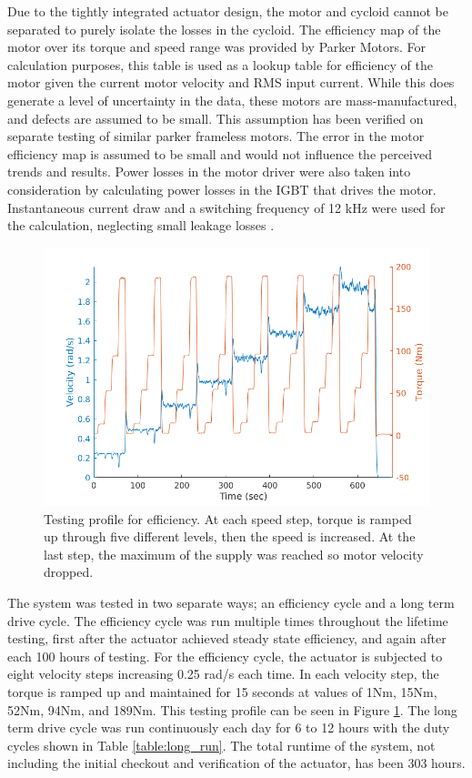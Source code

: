 Due to the tightly integrated actuator design, the motor and cycloid cannot be separated to purely isolate the losses in the cycloid.
The efficiency map of the motor over its torque and speed range was provided by Parker Motors.
For calculation purposes, this table is used as a lookup table for efficiency of the motor given the current motor velocity and RMS input current.
While this does generate a level of uncertainty in the data, these motors are mass-manufactured, and defects are assumed to be small. This assumption has been verified on separate testing of similar parker frameless motors. 
The error in the motor efficiency map is assumed to be small and would not influence the perceived trends and results.
Power losses in the motor driver were also taken into consideration by calculating power losses in the IGBT that drives the motor.
Instantaneous current draw and a switching frequency of 12 kHz were used for the calculation, neglecting small leakage losses \cite{ref:IGBTPower}.

\begin{figure}[t]
   \centering
   \includegraphics[width=\linewidth]{fig/eff_test_profile_v4}
   \caption{Testing profile for efficiency.
   At each speed step, torque is ramped up through five different levels, then the speed is increased.
   At the last step, the maximum of the supply was reached so motor velocity dropped.}
   \label{fig:eff_profile}
\end{figure}

The system was tested in two separate ways; an efficiency cycle and a long term drive cycle.
The efficiency cycle was run multiple times throughout the lifetime testing, first after the actuator achieved steady state efficiency, and again after each 100 hours of testing.
For the efficiency cycle, the actuator is subjected to eight velocity steps increasing 0.25 rad/s each time.
In each velocity step, the torque is ramped up and maintained for 15 seconds at values of 1Nm, 15Nm, 52Nm, 94Nm, and 189Nm.
This testing profile can be seen in Figure \ref{fig:eff_profile}.
The long term drive cycle was run continuously each day for 6 to 12 hours with the duty cycles shown in Table \ref{table:long_run}.
The total runtime of the system, not including the initial checkout and verification of the actuator, has been 303 hours.

